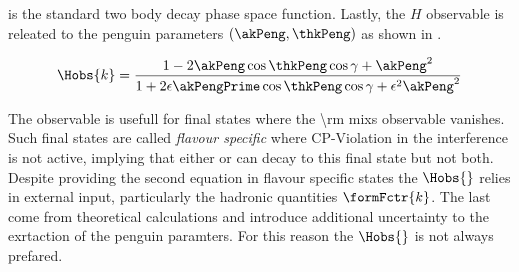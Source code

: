 \noindent is the standard two body decay phase space function. Lastly, the $H$ observable is releated to the penguin parameters
$(\akPeng,\thkPeng)$ as shown in .

\begin{equation}
\centering
  \Hobs{k} = \frac{1-2\akPeng\cos\thkPeng\cos\gamma + \akPeng^2}{1+2\epsilon\akPengPrime\cos\thkPeng\cos\gamma + \epsilon^2\akPeng^2}
\label{Hobs_peng_param}
\end{equation}

The observable is usefull for final states where the \Acp{\rm mix} observable vanishes. Such final states are called {\it flavour specific}
where CP-Violation in the interference is not active, implying that either \Bs or \Bsb can decay to this final state but not both.
Despite providing the second equation in flavour specific states the $\Hobs{}$ relies in external input, particularly the hadronic quantities $\formFctr{k}$.
The last come from theoretical calculations and introduce additional uncertainty to the exrtaction of the penguin paramters.
For this reason the $\Hobs{}$ is not always prefared.
